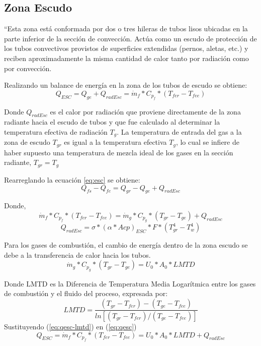 \subsection{Zona Escudo}
\par “Esta zona está conformada por dos o tres hileras de tubos lisos ubicadas en la parte inferior de la sección de convección. Actúa como un escudo de protección de los tubos convectivos provistos de superficies extendidas (pernos, aletas, etc.) y reciben aproximadamente la misma cantidad de calor tanto por radiación como por convección.
\par Realizando un balance de energía en la zona de los tubos de escudo se obtiene:
\begin{equation}
\label{eq:esc}
Q_{ESC} = Q_{ge} + Q_{radEsc} = \dot m_{f} *C_{p_f} *(T_{fer} - T_{fee})
\end{equation}
\par Donde $Q_{radEsc}$ es el calor por radiación que proviene directamente de la zona radiante hacia el escudo de tubos y que fue calculado al determinar la temperatura efectiva de radiación $T_g$. La temperatura de entrada del gas a la zona de escudo $T_{gr}$ es igual a la temperatura efectiva $T_g$, lo cual se infiere de haber supuesto una temperatura de mezcla ideal de los gases en la sección radiante, $T_{gr} = T_g$
\par Rearreglando la ecuación \ref{eq:esc} se obtiene:
\begin{equation}
Q_{fs} - Q_{fe} = Q_{gr} - Q_{ge} + Q_{radEsc}
\end{equation}
\par Donde,
\begin{equation}
\label{eq:qesc}
\dot m_{f} *C_{p_f} *(T_{fer} - T_{fee}) = 
\dot m_{g} *C_{p_g} *(T_{gr}  - T_{ge}) + Q_{radEsc}
\end{equation}
\begin{equation} \label{eq:esc-radi}
Q_{radEsc} = \sigma *(\alpha *Acp )_{ESC} *F *(T_{gr}^4 -T_w^4)
\end{equation}
\par Para los gases de combustión, el cambio de energía dentro de la zona escudo se debe a la transferencia de calor hacia los tubos.
\begin{equation}
\label{eq:qesc-lmtd}
\dot m_{g} *C_{p_g} *(T_{gr} -T_{ge}) = U_0 *A_0 *LMTD
\end{equation}
\par Donde LMTD es la Diferencia de Temperatura Media Logarítmica entre los gases de combustión y el fluido del proceso, expresada por:
\begin{equation}
\label{eq:lmtd}
   LMTD = \frac{(T_{gr}-T_{fer}) - (T_{ge}-T_{fee})}
   {ln[(T_{gr}-T_{fer}) /(T_{ge}-T_{fee})]}
\end{equation}
Sustituyendo (\ref{eq:qesc-lmtd}) en (\ref{eq:qesc})
\begin{equation}
\label{eq:tesc}
  Q_{ESC} = \dot m_{f} *C_{p_f} *(T_{fer} - T_{fee}) = U_0 *A_0 *LMTD + Q_{radEsc}
\end{equation}


